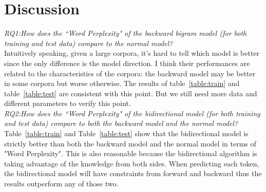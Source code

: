 \documentclass[10pt]{article}
\begin{document}
\section{Discussion}

\emph{RQ1:How does the ``Word Perplexity" of the backward bigram model (for both training and test data) compare to the normal model?}
\\

Intuitively speaking, given a large corpora, it's hard to tell which model is better since the only difference is the model direction. I think their performances are related to the 
characteristics of the corpora: the backward model may be better in some corpora but worse otherwise. The results of table~\ref{table:train} and table~\ref{table:test} are consistent with this point. But we still need more data and different parameters to verify this point.
\\

\emph{RQ2:How does the ``Word Perplexity" of the bidirectional model (for both training and test data) compare to both the backward model and the normal model?}
\\

Table~\ref{table:train} and Table~\ref{table:test} show that the bidirectional model is strictly better than both the backward model and the normal model in terms of "Word Perplexity". This is also reasonable because the bidirectional algorithm is taking advantage of the knowledge from both sides. When predicting each token, the bidirectional model will have constraints from forward and backward thus the results outperform any of those two. 
\end{document}
